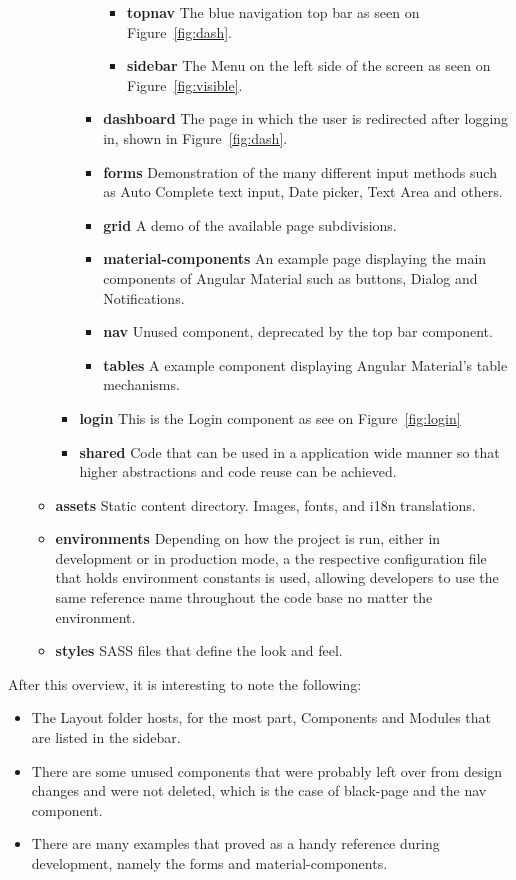 \begin{itemize}
\begin{itemize}
\begin{itemize}
\begin{itemize}
        \begin{itemize}
        \item \textbf{topnav} The blue navigation top bar as seen on Figure~\ref{fig:dash}.
        \item \textbf{sidebar} The Menu on the left side of the screen as seen on Figure~\ref{fig:visible}.
        \end{itemize}
      \item \textbf{dashboard} The page in which the user is redirected after logging in, shown in Figure~\ref{fig:dash}.
      \item \textbf{forms} Demonstration of the many different input methods such as Auto Complete text input, Date picker, Text Area and others.
      \item \textbf{grid} A demo of the available page subdivisions.
      \item \textbf{material-components} An example page displaying the main components of Angular Material such as buttons, Dialog and Notifications.
      \item \textbf{nav} Unused component, deprecated by the top bar component.
      \item \textbf{tables} A example component displaying Angular Material's table mechanisms.
      \end{itemize}

    \item \textbf{login} This is the Login component as see on Figure~\ref{fig:login}
    \item \textbf{shared} Code that can be used in a application wide manner so that higher abstractions and code reuse can be achieved.
    \end{itemize}
  \item \textbf{assets} Static content directory. Images, fonts, and i18n translations.
  \item \textbf{environments} Depending on how the project is run, either in development or in production mode, a the respective configuration file that holds environment constants is used, allowing developers to use the same reference name throughout the code base no matter the environment.
  \item \textbf{styles} \gls{SASS} files that define the look and feel.
  \end{itemize}
\end{itemize}

After this overview, it is interesting to note the following:
\begin{itemize}
\item The Layout folder hosts, for the most part, Components and Modules that are listed in the sidebar.\item There are some unused components that were probably left over from design changes and were not deleted, which is the case of black-page and the nav component.
\item There are many examples that proved as a handy reference during development, namely the forms and material-components.
\end{itemize}

